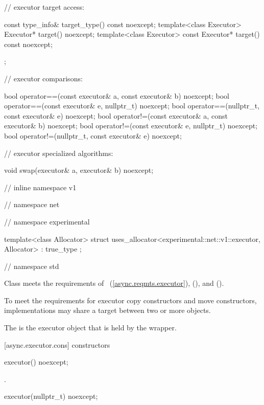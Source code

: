 \begin{codeblock}
{{{{{    // executor target access:

    const type_info& target_type() const noexcept;
    template<class Executor> Executor* target() noexcept;
    template<class Executor> const Executor* target() const noexcept;
  };

  // executor comparisons:

  bool operator==(const executor& a, const executor& b) noexcept;
  bool operator==(const executor& e, nullptr_t) noexcept;
  bool operator==(nullptr_t, const executor& e) noexcept;
  bool operator!=(const executor& a, const executor& b) noexcept;
  bool operator!=(const executor& e, nullptr_t) noexcept;
  bool operator!=(nullptr_t, const executor& e) noexcept;

  // executor specialized algorithms:

  void swap(executor& a, executor& b) noexcept;

} // inline namespace v1
} // namespace net
} // namespace experimental

  template<class Allocator>
    struct uses_allocator<experimental::net::v1::executor, Allocator>
      : true_type {};

} // namespace std
\end{codeblock}

\pnum
Class  meets the requirements of ~(\ref{async.reqmts.executor}),  (), and  ().

\pnum
\begin{note} To meet the  requirements for executor copy constructors and move constructors, implementations may share a target between two or more  objects. \end{note}

\pnum
The  is the executor object that is held by the wrapper.


[async.executor.cons]{ constructors}

\begin{itemdecl}
executor() noexcept;
\end{itemdecl}

\begin{itemdescr}
\pnum
\postconditions {}.
\end{itemdescr}

\begin{itemdecl}
executor(nullptr_t) noexcept;
\end{itemdecl}

